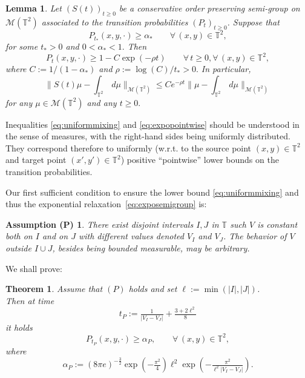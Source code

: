 \documentclass[12pt]{article}
\newtheorem{thm}{Theorem}
\newtheorem{lem}{Lemma}
\newtheorem*{AP}{Assumption (P)}
\newcommand{\T}{\mathbb{T}}
\begin{document}
\begin{lem}\label{lem:doeblin}
Let $(S(t))_{t\geq 0}$ be a conservative order preserving semi-group on 
$\mathcal{M}(\T^2)$ associated to the transition probabilities $(P_t)_{t\geq 0}$. Suppose that 
\begin{equation}\label{eq:uniformmixing}
P_{t_*}(x,y, \cdot) \geq \alpha_* \qquad \forall\, (x,y) \in \T^2,
\end{equation}
for some $t_* > 0$ and $0 < \alpha_* < 1.$ Then
\begin{equation}\label{eq:expopointwise}
P_t(x,y, \cdot) \geq 1 - C
\exp(-\rho t)
\qquad \forall\, t \geq 0, \forall\, (x,y) \in \T^2,
\end{equation}
where $C := 1/(1- \alpha_*)$ and $\rho := \log(C)/ t_* > 0.$
In particular, 
\begin{equation}\label{eq:exposemigroup}
\|S(t)\mu - \int_{\T^2} \, d\mu\|_{\mathcal{M}(\T^2)} \leq C 
e^{-\rho t}\|\mu - \int_{\T^2} \, d\mu\|_{\mathcal{M}(\T^2)}
\end{equation}
for any $\mu \in \mathcal{M}(\T^2)$ and any $t\geq 0.$
\end{lem}
\noindent Inequalities \eqref{eq:uniformmixing} and \eqref{eq:expopointwise} 
should be understood in the sense of measures, with the right-hand sides being 
uniformly distributed. They correspond therefore  to uniformly (w.r.t. to the 
source point $(x,y) \in \T^2$ and target point $(x',y') \in \T^2$) positive 
``pointwise'' lower bounds on the transition probabilities.

\smallskip\noindent
Our first sufficient condition to ensure the lower bound \eqref{eq:uniformmixing} 
and thus the exponential relaxation~\eqref{eq:exposemigroup} is: 

\begin{AP} 
There exist disjoint intervals  $I, J$ in $\T$ such $V$ is
constant both on $I$ and on $J$ with different values denoted
$V_I$ and $V_J$. The behavior of $V$ outside $I \cup J$, 
besides being bounded measurable, may be arbitrary.
\end{AP}
\noindent

\noindent We shall prove:

\begin{thm}\label{thm:plateau}
Assume that $(P)$ holds and set $\ell := \min(|I|, |J|)$.\\
Then at time 
\begin{equation}\label{def:tP}
t_P :=  \tfrac{1}{|V_I - V_J|} + \tfrac{3 + 2\ell^2}{8} 
\end{equation}
it holds
\begin{equation}\label{eq:lowerbP}
P_{t_P}(x,y,\cdot) \geq \alpha_P, \qquad \forall\, (x,y) \in \T^2,
\end{equation}
where   
$$
\alpha_P := (8\pi e)^{-\frac32}\exp(-\tfrac{\pi^2}{4}) \ell^2 
\exp(-\tfrac{\pi^2}{\ell^2|V_I - V_J|}).
$$
\end{thm}
\end{document}
